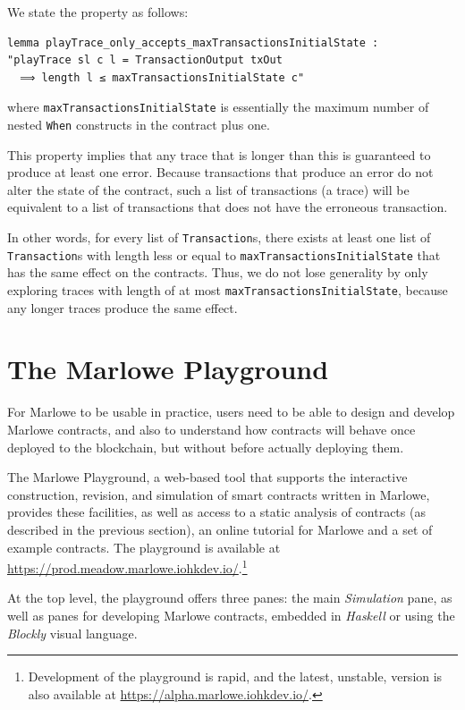\documentclass[runningheads]{llncs}
\begin{document}
We state the property as follows:

\begin{verbatim}
lemma playTrace_only_accepts_maxTransactionsInitialState :
"playTrace sl c l = TransactionOutput txOut
  ⟹ length l ≤ maxTransactionsInitialState c"
\end{verbatim}

\noindent
where \texttt{maxTransactionsInitialState} is essentially the maximum number of nested \texttt{When} constructs in the contract plus one.

This property implies that any trace that is longer than this is guaranteed to produce at least one error. Because transactions that produce an error do not alter the state of the contract, such a list of transactions (a trace) will be equivalent to a list of transactions that does not have the erroneous transaction.

In other words, for every list of \texttt{Transaction}s, there exists at least one list of \texttt{Transaction}s with length less or equal to \texttt{maxTransactionsInitialState} that has the same effect on the contracts. 
Thus, we do not lose generality by only exploring traces with length of at most \texttt{maxTransactionsInitialState}, because any longer traces produce the same effect.

\section{The Marlowe Playground}
\label{sec:playground}

For Marlowe to be usable in practice, users need to be able to design and develop Marlowe contracts, and also to understand how contracts will behave once deployed to the blockchain, but without before actually deploying them.

The Marlowe Playground, a web-based tool that supports the interactive construction, revision, and simulation of smart contracts written in Marlowe, provides these facilities, as well as access to a static analysis of contracts (as described in the previous section), an online tutorial for Marlowe and a set of example contracts. The playground is available at \url{https://prod.meadow.marlowe.iohkdev.io/}.\footnote{Development of the playground is rapid, and the latest, unstable, version is also available at \url{https://alpha.marlowe.iohkdev.io/}.}

At the top level, the playground offers three panes: the main \emph{Simulation} pane, as well as panes for developing Marlowe contracts, embedded in \emph{Haskell} or using the \emph{Blockly} visual language.
\end{document}
